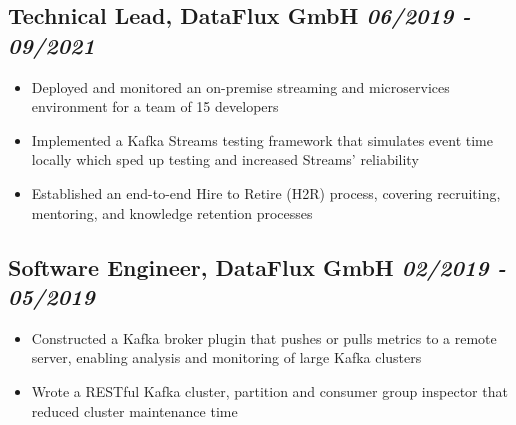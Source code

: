 \documentclass[a4paper]{article}
\newcommand{\bolditalicpair}
[2]
{\textbf{#1} \texorpdfstring{\hfill}{} \textit{#2}}
\begin{document}
\subsection{\bolditalicpair{Technical Lead, DataFlux GmbH}{06/2019 - 09/2021}}

\begin{itemize}
 \item Deployed and monitored an on-premise streaming and microservices environment for a team of 15 developers
 \item Implemented a Kafka Streams testing framework that simulates event time locally which sped up testing and increased Streams' reliability
 \item Established an end-to-end Hire to Retire (H2R) process, covering recruiting, mentoring, and knowledge retention processes
\end{itemize}

\subsection{\bolditalicpair{Software Engineer, DataFlux GmbH}{02/2019 - 05/2019}}

\begin{itemize}
  \item Constructed a Kafka broker plugin that pushes or pulls metrics to a remote server, enabling analysis and monitoring of large Kafka clusters
  \item Wrote a RESTful Kafka cluster, partition and consumer group inspector that reduced cluster maintenance time
\end{itemize}


\end{document}
